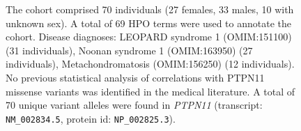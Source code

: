 \begin{figure}[htbp]
\vspace{2em}

\caption{The cohort comprised 70 individuals (27 females, 33 males, 10 with unknown sex). A total of 69 HPO terms were used to annotate the cohort. Disease diagnoses: LEOPARD syndrome 1 (OMIM:151100) (31 individuals), Noonan syndrome 1 (OMIM:163950) (27 individuals), Metachondromatosis (OMIM:156250) (12 individuals). No previous statistical analysis of correlations with PTPN11 missense variants was identified in the medical literature. A total of 70 unique variant alleles were found in \textit{PTPN11} (transcript: \texttt{NM\_002834.5}, protein id: \texttt{NP\_002825.3}).}
\end{figure}
